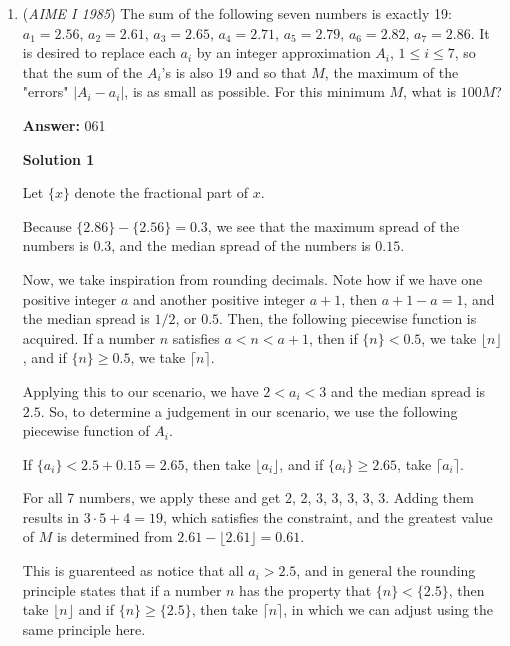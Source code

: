 \begin{enumerate}
 Note: the problem where this is linked is covered 0:20-1:10

 


	\item (\textit{AIME I 1985}) The sum of the following seven numbers is exactly 19: $a_1 = 2.56$, $a_2 = 2.61$, $a_3 = 2.65$, $a_4 = 2.71$, $a_5 = 2.79$, $a_6 = 2.82$, $a_7 = 2.86$. It is desired to replace each $a_i$ by an integer approximation $A_i$, $1\le i \le 7$, so that the sum of the $A_i$'s is also $19$ and so that $M$, the maximum of the "errors" $\lvert A_i-a_i \rvert$, is as small as possible. For this minimum $M$, what is $100M$?


 
 \textbf{Answer: }061



\textbf{Solution 1}

Let \( \{x\} \) denote the fractional part of \( x \).

 Because \( \{2.86\} - \{2.56\} = 0.3 \), we see that the maximum spread of the numbers is \( 0.3 \), and the median spread of the numbers is \( 0.15 \).

 Now, we take inspiration from rounding decimals. Note how if we have one positive integer \( a \) and another positive integer \( a+1 \), then \( a+1-a=1 \), and the median spread is \( 1/2 \), or \( 0.5 \). Then, the following piecewise function is acquired. If a number \( n \) satisfies \( a < n < a+1 \), then if \( \{n\} < 0.5 \), we take \( \lfloor{n} \rfloor \), and if \( \{n\} \ge 0.5 \), we take \( \lceil{n} \rceil \).

 Applying this to our scenario, we have \( 2 < a_i < 3 \) and the median spread is \( 2.5 \). So, to determine a judgement in our scenario, we use the following piecewise function of \( A_i \).

 If \( \{a_i\} < 2.5 + 0.15 = 2.65 \), then take \( \lfloor{a_i} \rfloor \), and if \( \{a_i\} \ge 2.65 \), take \( \lceil{a_i} \rceil \).

 For all 7 numbers, we apply these and get 2, 2, 3, 3, 3, 3, 3. Adding them results in \( 3 \cdot 5 + 4 = 19 \), which satisfies the constraint, and the greatest value of \( M \) is determined from \( 2.61 - \lfloor{2.61} \rfloor = 0.61 \).

 This is guarenteed as notice that all \( a_i > 2.5 \), and in general the rounding principle states that if a number \( n \) has the property that \( \{n\} < \{2.5\} \), then take \( \lfloor{n} \rfloor \) and if \( \{n\} \ge \{2.5\} \), then take \( \lceil{n} \rceil \), in which we can adjust using the same principle here.


\end{enumerate}
